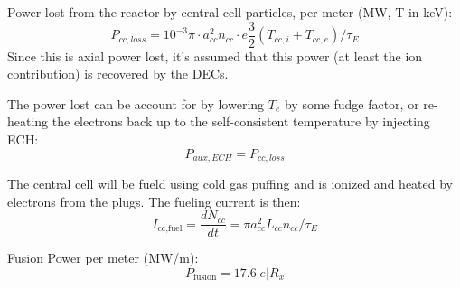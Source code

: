 Power lost from the reactor by central cell particles, per meter (MW, T in keV):
\begin{equation}
    P_{cc, loss} = 10^{-3} \pi \cdot a_{cc}^2 n_{cc} \cdot e \frac{3}{2}\left( T_{cc,i} + T_{cc,e} \right) / \tau_E
\end{equation}
Since this is axial power lost, it's assumed that this power (at least the ion contribution) is recovered by the DECs. 

The power lost can be account for by lowering $T_e$ by some fudge factor, or re-heating the electrons back up to the self-consistent temperature by injecting ECH:
\begin{equation}
    P_{aux, ECH} = P_{cc, loss}
\end{equation}

The central cell will be fueld using cold gas puffing and is ionized and heated by electrons from the plugs. The fueling current is then:
\begin{equation}
    I_{\text{cc,fuel}} = \frac{dN_{cc}}{dt} = \pi a_{cc}^2 L_{cc} n_{cc} / \tau_E
\end{equation}




Fusion Power per meter (MW/m): 
\begin{equation}
    P_{\text{fusion}} = 17.6|e|R_x  
\end{equation}

